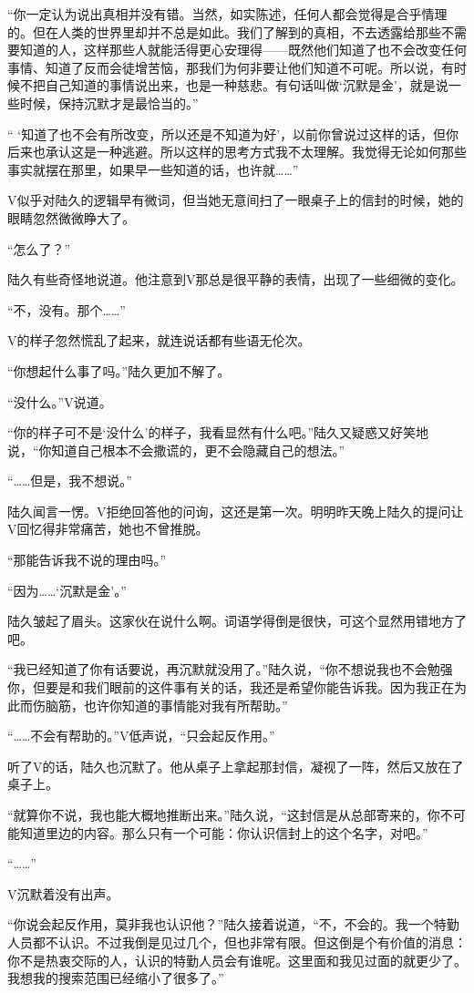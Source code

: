 “你一定认为说出真相并没有错。当然，如实陈述，任何人都会觉得是合乎情理的。但在人类的世界里却并不总是如此。我们了解到的真相，不去透露给那些不需要知道的人，这样那些人就能活得更心安理得——既然他们知道了也不会改变任何事情、知道了反而会徒增苦恼，那我们为何非要让他们知道不可呢。所以说，有时候不把自己知道的事情说出来，也是一种慈悲。有句话叫做‘沉默是金’，就是说一些时候，保持沉默才是最恰当的。”

“ ‘知道了也不会有所改变，所以还是不知道为好’，以前你曾说过这样的话，但你后来也承认这是一种逃避。所以这样的思考方式我不太理解。我觉得无论如何那些事实就摆在那里，如果早一些知道的话，也许就……”

V似乎对陆久的逻辑早有微词，但当她无意间扫了一眼桌子上的信封的时候，她的眼睛忽然微微睁大了。

“怎么了？”

陆久有些奇怪地说道。他注意到V那总是很平静的表情，出现了一些细微的变化。

“不，没有。那个……”

V的样子忽然慌乱了起来，就连说话都有些语无伦次。

“你想起什么事了吗。”陆久更加不解了。

“没什么。”V说道。

“你的样子可不是‘没什么’的样子，我看显然有什么吧。”陆久又疑惑又好笑地说，“你知道自己根本不会撒谎的，更不会隐藏自己的想法。”

“……但是，我不想说。”

陆久闻言一愣。V拒绝回答他的问询，这还是第一次。明明昨天晚上陆久的提问让V回忆得非常痛苦，她也不曾推脱。

“那能告诉我不说的理由吗。”

“因为……‘沉默是金’。”

陆久皱起了眉头。这家伙在说什么啊。词语学得倒是很快，可这个显然用错地方了吧。

“我已经知道了你有话要说，再沉默就没用了。”陆久说，“你不想说我也不会勉强你，但要是和我们眼前的这件事有关的话，我还是希望你能告诉我。因为我正在为此而伤脑筋，也许你知道的事情能对我有所帮助。”

“……不会有帮助的。”V低声说，“只会起反作用。”

听了V的话，陆久也沉默了。他从桌子上拿起那封信，凝视了一阵，然后又放在了桌子上。

“就算你不说，我也能大概地推断出来。”陆久说，“这封信是从总部寄来的，你不可能知道里边的内容。那么只有一个可能：你认识信封上的这个名字，对吧。”

“……”

V沉默着没有出声。

“你说会起反作用，莫非我也认识他？”陆久接着说道，“不，不会的。我一个特勤人员都不认识。不过我倒是见过几个，但也非常有限。但这倒是个有价值的消息：你不是热衷交际的人，认识的特勤人员会有谁呢。这里面和我见过面的就更少了。我想我的搜索范围已经缩小了很多了。”

